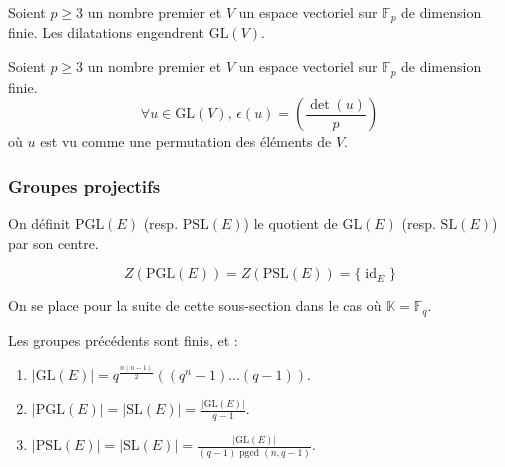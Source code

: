 	\begin{lemma}
		Soient $p \geq 3$ un nombre premier et $V$ un espace vectoriel sur $\mathbb{F}_p$ de dimension finie. Les dilatations engendrent $\mathrm{GL}(V)$.
	\end{lemma}
	
	
	\begin{application}
		Soient $p \geq 3$ un nombre premier et $V$ un espace vectoriel sur $\mathbb{F}_p$ de dimension finie.
		\[ \forall u \in \mathrm{GL}(V), \, \epsilon(u) = \left( \frac{\det(u)}{p} \right) \]
		où $u$ est vu comme une permutation des éléments de $V$.
	\end{application}
	
	\subsubsection{Groupes projectifs}
	
	
	\begin{definition}
		On définit $\mathrm{PGL}(E)$ (resp. $\mathrm{PSL}(E)$) le quotient de $\mathrm{GL}(E)$ (resp. $\mathrm{SL}(E)$) par son centre.
	\end{definition}
	
	\begin{proposition}
		\[ Z(\mathrm{PGL}(E)) = Z(\mathrm{PSL}(E)) = \{ \operatorname{id}_E \} \]
	\end{proposition}
	
	
	On se place pour la suite de cette sous-section dans le cas où $\mathbb{K} = \mathbb{F}_q$.
	
	\begin{proposition}
		Les groupes précédents sont finis, et :
		\begin{enumerate}[label=(\roman*)]
			\item $|\mathrm{GL}(E)| = q^{\frac{n(n-1)}{2}}((q^n-1) \dots (q-1))$.
			\item $|\mathrm{PGL}(E)| = |\mathrm{SL}(E)| = \frac{|\mathrm{GL}(E)|}{q-1}$.
			\item $|\mathrm{PSL}(E)| = |\mathrm{SL}(E)| = \frac{|\mathrm{GL}(E)|}{(q-1)\operatorname{pgcd}(n,q-1)}$.
		\end{enumerate}
	\end{proposition}
	
	
